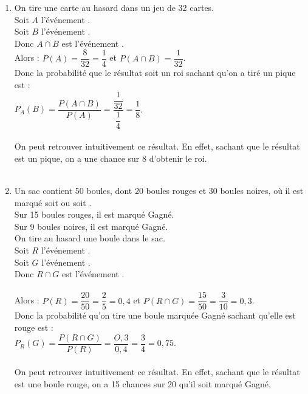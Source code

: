 \begin{exemples}
	\begin{enumerate}
		
		\item	On tire une carte au hasard dans un jeu de 32 cartes.\\
		Soit $A$ l'événement .\\
		Soit $B$ l'événement .\\
		Donc $A \cap B$ est l'événement .\\
		
		Alors : $P(A)= \dfrac{8}{32} = \dfrac{1}{4}$ et $P(A \cap B)= \dfrac{1}{32}$.\\
		Donc la probabilité que le résultat soit un roi sachant qu'on a tiré un pique est :\\
		$P_A(B)= \dfrac{P(A \cap B)}{P(A)}=\dfrac{\dfrac{1}{32}}{\dfrac{1}{4}}=\dfrac{1}{8}$.\\
		\ \\
		On peut retrouver intuitivement ce résultat. En effet, sachant que le résultat est un pique, on a une chance sur 8 d'obtenir le roi.\\
		\\
		\item Un sac contient 50 boules, dont 20 boules rouges et 30 boules noires, où il est marqué soit  ou soit .\\ 
		Sur 15 boules rouges, il est marqué Gagné.\\
		Sur 9 boules noires, il est marqué Gagné.\\
		On tire au hasard une boule dans le sac.\\
		Soit $R$ l'événement .\\
		Soit $G$ l'événement .\\
		Donc $R \cap G$ est l'événement .\\
		\ \\
		Alors : $P(R)= \dfrac{20}{50} = \dfrac{2}{5}=0,4$ et $P(R \cap G)= \dfrac{15}{50}=\dfrac{3}{10}=0,3$.\\
		Donc la probabilité qu'on tire une boule marquée Gagné sachant qu'elle est rouge est :\\
		$P_R(G)= \dfrac{P(R \cap G)}{P(R)}=\dfrac{O,3}{0,4}=\dfrac{3}{4}=0,75$.\\
		\ \\
		On peut retrouver intuitivement ce résultat. En effet, sachant que le résultat est une boule rouge, on a 15 chances sur 20 qu'il soit marqué Gagné.
	\end{enumerate}
\end{exemples}

